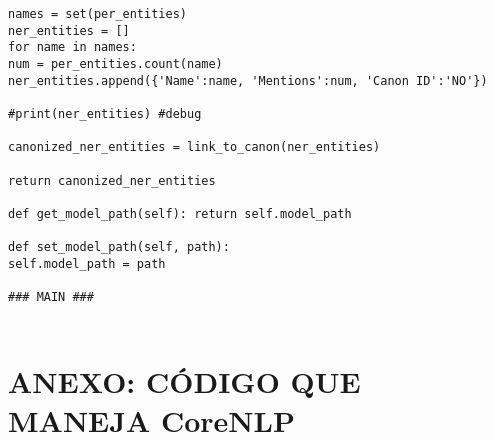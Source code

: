 \documentclass{pre-tfg}
\begin{document}
\begin{lstlisting}[style=consola]
names = set(per_entities)
ner_entities = []
for name in names:
num = per_entities.count(name)
ner_entities.append({'Name':name, 'Mentions':num, 'Canon ID':'NO'})

#print(ner_entities) #debug

canonized_ner_entities = link_to_canon(ner_entities)

return canonized_ner_entities

def get_model_path(self): return self.model_path

def set_model_path(self, path):
self.model_path = path

### MAIN ###


\end{lstlisting}

\cleardoublepage
\section{ANEXO: CÓDIGO QUE MANEJA CoreNLP}
\end{document}
